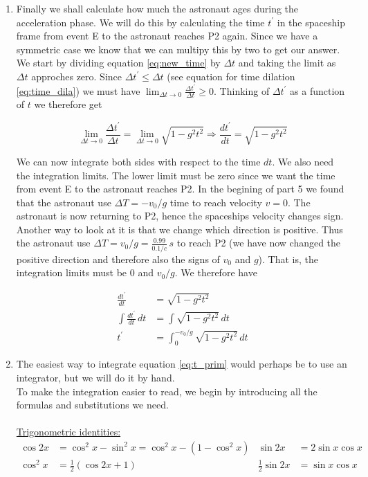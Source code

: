 \documentclass[a4paper,10pt,english]{article}
\begin{document}
\begin{enumerate}
\begin{enumerate}
\item Finally we shall calculate how much the astronaut ages during the acceleration phase. We will do this by calculating the time $t^{\prime}$ in the spaceship frame from event E to the astronaut reaches P2 again. Since we have a symmetric case we know that we can multipy this by two to get our answer.
\\
We start by dividing equation \ref{eq:new_time} by $\Delta t$ and taking the limit as $\Delta t$ approches zero. Since $\Delta t^{\prime}\leq\Delta t$ (see equation for time dilation \ref{eq:time_dila}) we must have $\lim_{\Delta t\to0}\frac{\Delta t^{\prime}}{\Delta t}\geq0$. Thinking of $\Delta t^{\prime}$ as a function of $t$ we therefore get

\[\lim_{\Delta t\to0}\frac{\Delta t^{\prime}}{\Delta t}=\lim_{\Delta t\to0}\sqrt{1-g^{2}t^{2}}\Rightarrow\frac{dt^{\prime}}{dt}=\sqrt{1-g^{2}t^{2}}\]

We can now integrate both sides with respect to the time $dt$. We also need the integration limits. The lower limit must be zero since we want the time from event E to the astronaut reaches P2. In the begining of part 5 we found that the astronaut use $\Delta T=-v_{0}/g$ time to reach velocity $v=0$. The astronaut is now returning to P2, hence the spaceships velocity changes sign. Another way to look at it is that we change which direction is positive. Thus the astronaut use $\Delta T=v_{0}/g=\frac{0.99}{0.1/c}\,s$ to reach P2 (we have now changed the positive direction and therefore also the signs of $v_{0}$ and $g$). That is, the integration limits must be $0$ and $v_{0}/g$. %
We therefore have

\begin{align}\label{eq:t_prim}
\frac{dt^{\prime}}{dt}&=\sqrt{1-g^{2}t^{2}} \nonumber\\
\int\frac{dt^{\prime}}{dt}\,dt&=\int\sqrt{1-g^{2}t^{2}}\,dt \nonumber\\
t^{\prime}&=\int_{0}^{-v_{0}/g}\sqrt{1-g^{2}t^{2}}\,dt
\end{align}


\item The easiest way to integrate equation \ref{eq:t_prim} would perhaps be to use an integrator, but we will do it by hand.
\\
To make the integration easier to read, %
we begin by introducing all the formulas and substitutions we need.
\\ \\
\underline{Trigonometric identities:}
\begin{align*}
\cos{2x}&=\cos^{2}{x}-\sin^{2}{x}=\cos^{2}{x}-(1-\cos^{2}{x}) & \sin{2x}&=2\sin{x}\cos{x}\\
\cos^{2}{x}&=\frac{1}{2}(\cos{2x}+1) & \frac{1}{2}\sin{2x}&=\sin{x}\cos{x}
\end{align*}


\end{enumerate}
\end{enumerate}
\end{document}
